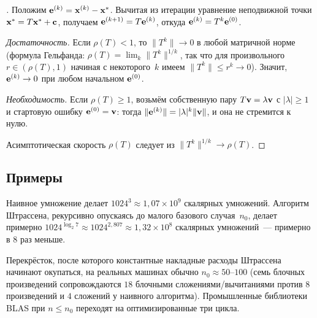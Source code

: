 \begin{proof}[]
Положим $\mathbf{e}^{(k)} = \mathbf{x}^{(k)} - \mathbf{x}^*$. Вычитая из
итерации уравнение неподвижной точки
$\mathbf{x}^* = T \mathbf{x}^* + \mathbf{c}$, получаем
$\mathbf{e}^{(k+1)} = T \mathbf{e}^{(k)}$, откуда
$\mathbf{e}^{(k)} = T^k \mathbf{e}^{(0)}$.

\emph{Достаточность.} Если $\rho(T) < 1$, то $\|T^k\| \to 0$ в любой
матричной норме (формула Гельфанда:
$\rho(T) = \lim_k \|T^k\|^{1/k}$, так что для произвольного
$r \in (\rho(T), 1)$ начиная с некоторого~$k$ имеем
$\|T^k\| \leq r^k \to 0$). Значит, $\mathbf{e}^{(k)} \to 0$ при любом
начальном $\mathbf{e}^{(0)}$.

\emph{Необходимость.} Если $\rho(T) \geq 1$, возьмём собственную
пару $T \mathbf{v} = \lambda \mathbf{v}$ с $|\lambda| \geq 1$ и стартовую
ошибку $\mathbf{e}^{(0)} = \mathbf{v}$: тогда
$\|\mathbf{e}^{(k)}\| = |\lambda|^k \|\mathbf{v}\|$, и она не стремится
к нулю.

Асимптотическая скорость $\rho(T)$ следует из
$\|T^k\|^{1/k} \to \rho(T)$.
\end{proof}

\subsection*{Примеры}

\begin{example}[Наивный алгоритм против Штрассена при $n = 1024$]
\label{ex:naive-vs-strassen}
Наивное умножение делает $1024^3 \approx 1{,}07 \times 10^9$
скалярных умножений. Алгоритм Штрассена, рекурсивно опускаясь до
малого базового случая~$n_0$, делает примерно
$1024^{\log_2 7} \approx 1024^{2{,}807} \approx 1{,}32 \times 10^8$
скалярных умножений~--- примерно в $8$ раз меньше.

Перекрёсток, после которого константные накладные расходы Штрассена
начинают окупаться, на реальных машинах обычно $n_0 \approx 50$--$100$
(семь блочных произведений сопровождаются $18$ блочными
сложениями/вычитаниями против $8$ произведений и $4$ сложений у
наивного алгоритма). Промышленные библиотеки BLAS при $n \leq n_0$
переходят на оптимизированные три цикла.
\end{example}

